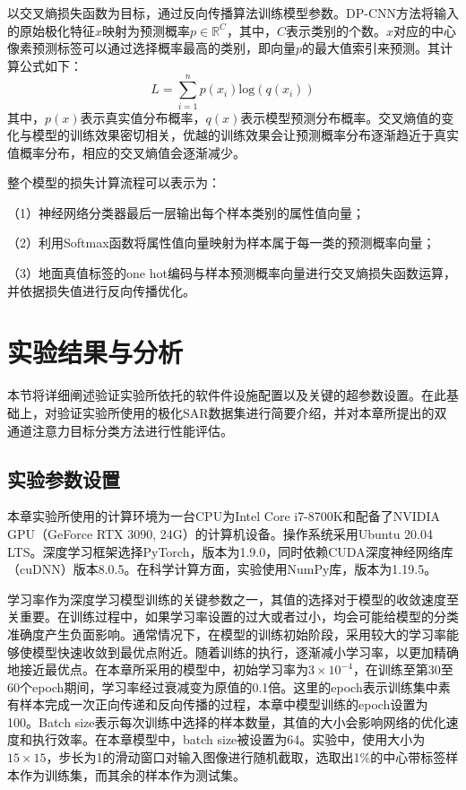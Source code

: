 以交叉熵损失函数为目标，通过反向传播算法训练模型参数。DP-CNN方法将输入的原始极化特征$x$映射为预测概率$p\in \mathbb{R}^{C}$，其中，$C$表示类别的个数。$x$对应的中心像素预测标签可以通过选择概率最高的类别，即向量$p$的最大值索引来预测。其计算公式如下：
\begin{equation}
    L=\sum_{i=1}^{n}p(x_i)\text{log}(q(x_i))
\end{equation}
其中，$p(x)$表示真实值分布概率，$q(x)$表示模型预测分布概率。交叉熵值的变化与模型的训练效果密切相关，优越的训练效果会让预测概率分布逐渐趋近于真实值概率分布，相应的交叉熵值会逐渐减少。

整个模型的损失计算流程可以表示为：

（1）神经网络分类器最后一层输出每个样本类别的属性值向量；

（2）利用Softmax函数将属性值向量映射为样本属于每一类的预测概率向量；

（3）地面真值标签的one hot编码与样本预测概率向量进行交叉熵损失函数运算，并依据损失值进行反向传播优化。


\section{实验结果与分析}
本节将详细阐述验证实验所依托的软件件设施配置以及关键的超参数设置。在此基础上，对验证实验所使用的极化SAR数据集进行简要介绍，并对本章所提出的双通道注意力目标分类方法进行性能评估。

\subsection{实验参数设置}
本章实验所使用的计算环境为一台CPU为Intel Core i7-8700K和配备了NVIDIA GPU（GeForce RTX 3090, 24G）的计算机设备。操作系统采用Ubuntu 20.04 LTS。深度学习框架选择PyTorch，版本为1.9.0，同时依赖CUDA深度神经网络库（cuDNN）版本8.0.5。在科学计算方面，实验使用NumPy库，版本为1.19.5。

学习率作为深度学习模型训练的关键参数之一，其值的选择对于模型的收敛速度至关重要。在训练过程中，如果学习率设置的过大或者过小，均会可能给模型的分类准确度产生负面影响。通常情况下，在模型的训练初始阶段，采用较大的学习率能够使模型快速收敛到最优点附近。随着训练的执行，逐渐减小学习率，以更加精确地接近最优点。在本章所采用的模型中，初始学习率为$3\times 10^{-4}$，在训练至第30至60个epoch期间，学习率经过衰减变为原值的0.1倍。这里的epoch表示训练集中素有样本完成一次正向传递和反向传播的过程，本章中模型训练的epoch设置为100。Batch size表示每次训练中选择的样本数量，其值的大小会影响网络的优化速度和执行效率。在本章模型中，batch size被设置为64。实验中，使用大小为$15 \times 15$，步长为1的滑动窗口对输入图像进行随机截取，选取出1\%的中心带标签样本作为训练集，而其余的样本作为测试集。


